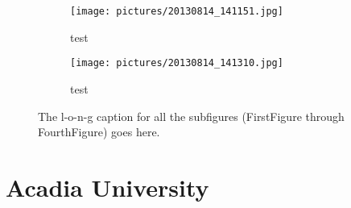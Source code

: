 \begin{figure}[ht!]
    \begin{center}

        \begin{subfigure}[t]{0.4\textwidth}
            \label{fig:fourth}
            \texttt{[image: pictures/20130814\_141151.jpg]}
            \caption{test}
        \end{subfigure}
        \hspace*{\fill}
        \begin{subfigure}[t]{0.4\textwidth}%
            \label{fig:fifth}
            \texttt{[image: pictures/20130814\_141310.jpg]}
            \caption{test}
        \end{subfigure}

    \end{center}
    \caption{%
            The l-o-n-g caption for all the subfigures
            (FirstFigure through FourthFigure) goes here.
    }%
    \label{fig:subfigurestwo}
\end{figure}

\section{Acadia University}




